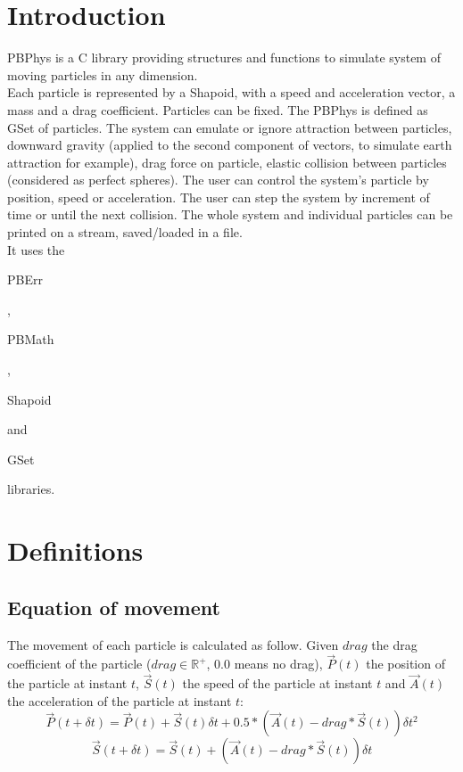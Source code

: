 \section*{Introduction}

PBPhys is a C library providing structures and functions to simulate system of moving particles in any dimension.\\ 

Each particle is represented by a Shapoid, with a speed and acceleration vector, a mass and a drag coefficient. Particles can be fixed. The PBPhys is defined as GSet of particles. The system can emulate or ignore attraction between particles, downward gravity (applied to the second component of vectors, to simulate earth attraction for example), drag force on particle, elastic collision between particles (considered as perfect spheres). The user can control the system's particle by position, speed or acceleration. The user can step the system by increment of time or until the next collision. The whole system and individual particles can be printed on a stream, saved/loaded in a file.\\

It uses the \begin{ttfamily}PBErr\end{ttfamily}, \begin{ttfamily}PBMath\end{ttfamily}, \begin{ttfamily}Shapoid\end{ttfamily} and \begin{ttfamily}GSet\end{ttfamily} libraries.\\

\section{Definitions}

\subsection{Equation of movement}

The movement of each particle is calculated as follow. Given $drag$ the drag coefficient of the particle ($drag\in\mathbb{R}^+$, 0.0 means no drag), $\overrightarrow{P}(t)$ the position of the particle at instant $t$, $\overrightarrow{S}(t)$ the speed of the particle at instant $t$ and $\overrightarrow{A}(t)$ the acceleration of the particle at instant $t$:\\
\begin{equation}
\overrightarrow{P}(t+\delta t)=\overrightarrow{P}(t)+\overrightarrow{S}(t)\delta t+0.5*(\overrightarrow{A}(t)-drag*\overrightarrow{S}(t))\delta t^2
\end{equation}
\begin{equation}
\overrightarrow{S}(t+\delta t)=\overrightarrow{S}(t)+(\overrightarrow{A}(t)-drag*\overrightarrow{S}(t))\delta t
\end{equation}

